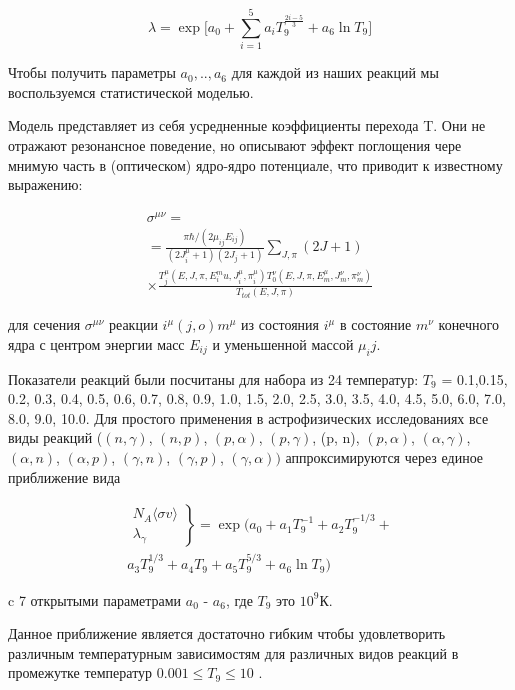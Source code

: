 \documentclass[%
master,    %
natbib,      %
subf,        %
href,        %
colorlinks,  %
]{disser}
\begin{document}
$$\lambda = \exp \bigg[a_0 + \sum_{i=1}^{5}a_iT_9^{\frac{2i-5}{3}}+a_6 \ln T_9\bigg]$$

Чтобы получить параметры $a_0, .., a_6$ для каждой из наших реакций мы воспользуемся статистической моделью.

Модель представляет из себя усредненные коэффициенты перехода T. Они не отражают резонансное поведение, но описывают эффект поглощения чере мнимую часть в (оптическом) ядро-ядро потенциале, что приводит к известному выражению:


\begin{multline}
\sigma^{\mu\nu} = \\
= \frac{\pi\hbar/(2\mu_{ij}E_{ij})}{(2J_i^\mu+1)(2J_j+1)}\sum_{J,\pi}(2J + 1) \\
\times \frac{T_j^\mu(E,J,\pi,E_i^mu, J_i^\mu,\pi_i^\mu)T_0^\nu(E,J,\pi,E_m^\mu,J_m^\nu,\pi_m^\nu)}{T_{tot}(E,J,\pi)}
\end{multline}

для сечения $\sigma^{\mu\nu}$ реакции $i^\mu(j,o)m^\mu$ из состояния $i^\mu$ в состояние $m^\nu$ конечного ядра с центром энергии масс $E_{ij}$ и уменьшенной массой $\mu_ij$.

Показатели реакций были посчитаны для набора из 24 температур: $T_9$ = 0.1,0.15, 0.2, 0.3, 0.4, 0.5, 0.6, 0.7, 0.8, 0.9, 1.0, 1.5, 2.0, 2.5, 3.0, 3.5, 4.0, 4.5, 5.0, 6.0, 7.0, 8.0, 9.0, 10.0. Для простого применения в астрофизических исследованиях все виды реакций ($(n,\gamma)$, $(n,p)$, $(p,\alpha)$, $(p, \gamma)$, (p, n), $(p, \alpha)$, $(\alpha, \gamma)$, $(\alpha, n)$, $(\alpha, p)$, $(\gamma, n)$, $(\gamma, p)$, $(\gamma, \alpha))$ аппроксимируются через единое приближение вида

\begin{equation}
\label{eq:system}
\begin{split}
\left.
	\begin{array}{ccc}
		N_{A}\langle \sigma v \rangle \\
		\lambda_\gamma
	\end{array}
\right\}
 = \exp (a_0 + a_1 T_9^{-1} + a_2 T_9^{-1/3} + \\
a_3 T_9^{1/3} + a_4 T_9 + a_5 T_9^{5/3} + a_6 \ln T_9)
\end{split}
\end{equation}

c 7 открытыми параметрами $a_0$ - $a_6$, где $T_9$ это $10^9$К.

Данное приближение является достаточно гибким чтобы удовлетворить различным температурным зависимостям для различных видов реакций в промежутке температур $0.001 \le T_9 \le 10$ \cite{rates}.
\end{document}
